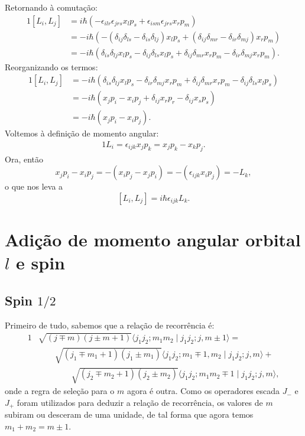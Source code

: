\documentclass{article}
\newcommand{\braket}[2]{\langle #1 \!\mid\! #2 \rangle}
\newcommand{\commut}[2]{\left[ #1 , #2 \right]}
\begin{document}
Retornando à comutação:
\begin{alignat}{1}
 \nonumber
 \commut{L_i}{L_j} &= i \hbar \left(-\epsilon_{ilr}\epsilon_{jrs} x_l p_s +\epsilon_{ism}\epsilon_{jrs} x_r p_m \right) \\ \nonumber
 &= -i \hbar \left(-\left( \delta_{ij}\delta_{ls} - \delta_{is}\delta_{lj} \right) x_l p_s +
 \left( \delta_{ij}\delta_{mr} - \delta_{ir}\delta_{mj} \right) x_r p_m \right) \\
 &= -i \hbar \left(\delta_{is}\delta_{lj} x_l p_s - \delta_{ij}\delta_{ls} x_l p_s + \delta_{ij}\delta_{mr} x_r p_m - \delta_{ir}\delta_{mj} x_r p_m \right) \mathrm{.}
\end{alignat}
Reorganizando os termos:
\begin{alignat}{1}
\nonumber
 \commut{L_i}{L_j} &=
 -i \hbar \left(\delta_{is}\delta_{lj} x_l p_s - \delta_{ir}\delta_{mj} x_r p_m + \delta_{ij}\delta_{mr} x_r p_m - \delta_{ij}\delta_{ls} x_l p_s \right) \\ \nonumber
 &= -i \hbar \left(x_j p_i - x_i p_j + \delta_{ij} x_r p_r - \delta_{ij} x_s p_s \right) \\
 &= -i \hbar \left(x_j p_i - x_i p_j \right)\mathrm{.}
\end{alignat}
Voltemos à definição de momento angular:
\begin{alignat}{1}
 L_i = \epsilon_{ijk}x_j p_k = x_j p_k - x_k p_j \mathrm{.}
\end{alignat}
Ora, então
\begin{equation}
 x_j p_i - x_i p_j = - \left( x_i p_j - x_j p_i \right) = - \left( \epsilon_{ijk} x_i p_j \right) = - L_k \mathrm{,}
\end{equation}
o que nos leva a
\begin{equation}
 \commut{L_i}{L_j} = i \hbar \epsilon_{ijk} L_k\mathrm{.}
\end{equation}

\section{Adição de momento angular orbital $l$ e spin}
\subsection{Spin $1 \slash 2$}
Primeiro de tudo, sabemos que a relação de recorrência é:
\begin{alignat}{1}
\nonumber
 &\sqrt{(j \mp m)(j \pm m + 1)} \braket{j_1 j_2;m_1m_2}{j_1j_2;j,m\pm1} = \\ \nonumber
 &\qquad \sqrt{(j_1 \mp m_1 + 1)(j_1 \pm m_1)} \braket{j_1 j_2;m_1\mp1,m_2}{j_1j_2;j,m} + \\
 &\qquad \qquad \sqrt{(j_2 \mp m_2 + 1)(j_2 \pm m_2)} \braket{j_1 j_2;m_1m_2\mp1}{j_1j_2;j,m} \mathrm{,}
\end{alignat}
onde a regra de seleção para o $m$ agora é outra. Como os operadores escada $J_-$ e $J_+$ foram utilizados para deduzir a relação de recorrência,
os valores de $m$ subiram ou desceram de uma unidade, de tal forma que agora temos $m_1 + m_2 = m\pm1$.
\end{document}
